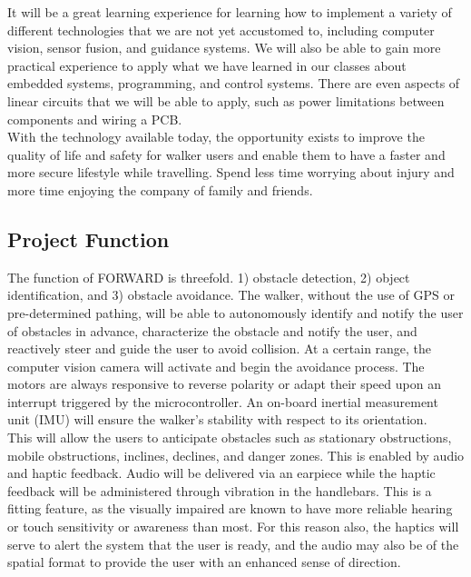 \noindent It will be a great learning experience for learning how to implement a variety of different technologies that we are not yet accustomed to, including computer vision, sensor fusion, and guidance systems. We will also be able to gain more practical experience to apply what we have learned in our classes about embedded systems, programming, and control systems. There are even aspects of linear circuits that we will be able to apply, such as power limitations between components and wiring a PCB. 
\\


\noindent With the technology available today, the opportunity exists to improve the quality of life and safety for walker users and enable them to have a faster and more secure lifestyle while travelling. Spend less time worrying about injury and more time enjoying the company of family and friends. \\

\subsection{Project Function}
\indent The function of FORWARD is threefold. 1) obstacle detection, 2) object identification, and 3) obstacle avoidance. The walker, without the use of GPS or pre-determined pathing, will be able to autonomously identify and notify the user of obstacles in advance, characterize the obstacle and notify the user, and reactively steer and guide the user to avoid collision. At a certain range, the computer vision camera will activate and begin the avoidance process. The motors are always responsive to reverse polarity or adapt their speed upon an interrupt triggered by the microcontroller. An on-board inertial measurement unit (IMU) will ensure the walker’s stability with respect to its orientation.
\\


\noindent This will allow the users to anticipate obstacles such as stationary obstructions, mobile obstructions, inclines, declines, and danger zones. This is enabled by audio and haptic feedback. Audio will be delivered via an earpiece while the haptic feedback will be administered through vibration in the handlebars. This is a fitting feature, as the visually impaired are known to have more reliable hearing or touch sensitivity or awareness than most. For this reason also, the haptics will serve to alert the system that the user is ready, and the audio may also be of the spatial format to provide the user with an enhanced sense of direction.


